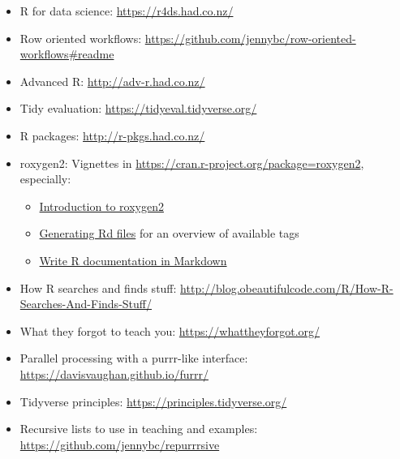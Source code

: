 \documentclass[]{book}
\begin{document}
\begin{itemize}
\item
  R for data science: \url{https://r4ds.had.co.nz/}
\item
  Row oriented workflows: \url{https://github.com/jennybc/row-oriented-workflows\#readme}
\item
  Advanced R: \url{http://adv-r.had.co.nz/}
\item
  Tidy evaluation: \url{https://tidyeval.tidyverse.org/}
\item
  R packages: \url{http://r-pkgs.had.co.nz/}
\item
  roxygen2: Vignettes in \url{https://cran.r-project.org/package=roxygen2}, especially:

  \begin{itemize}
  \item
    \href{https://cran.r-project.org/web/packages/roxygen2/vignettes/roxygen2.html}{Introduction to roxygen2}
  \item
    \href{https://cran.r-project.org/web/packages/roxygen2/vignettes/rd.html}{Generating Rd files} for an overview of available tags
  \item
    \href{https://cran.r-project.org/web/packages/roxygen2/vignettes/markdown.html}{Write R documentation in Markdown}
  \end{itemize}
\item
  How R searches and finds stuff: \url{http://blog.obeautifulcode.com/R/How-R-Searches-And-Finds-Stuff/}
\item
  What they forgot to teach you: \url{https://whattheyforgot.org/}
\item
  Parallel processing with a purrr-like interface: \url{https://davisvaughan.github.io/furrr/}
\item
  Tidyverse principles: \url{https://principles.tidyverse.org/}
\item
  Recursive lists to use in teaching and examples: \url{https://github.com/jennybc/repurrrsive}
\end{itemize}
\end{document}
